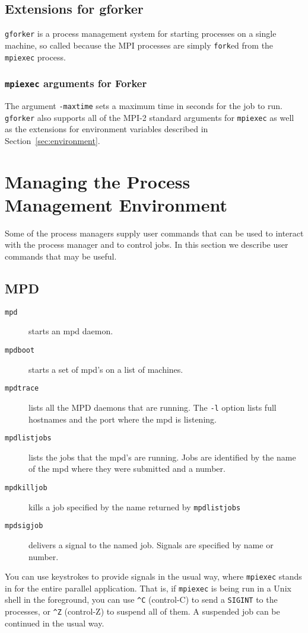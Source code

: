 \documentclass[dvipdfm,11pt]{article}
\begin{document}
\subsection{Extensions for gforker}
\label{sec:extensions-forker}
\texttt{gforker} is a process management system for starting
processes on a single machine, so called because the MPI processes are
simply \texttt{fork}ed from the \texttt{mpiexec} process.

\subsubsection{\texttt{mpiexec} arguments for Forker}
\label{sec:mpiexec-forker}

The argument \texttt{-maxtime} sets a maximum time in seconds for the
job to run.  \texttt{gforker} also supports all of the MPI-2 standard
arguments for \texttt{mpiexec} as well as the extensions for
environment variables described in Section~\ref{sec:environment}.


\section{Managing the Process Management Environment}
\label{sec:managing-pme}

Some of the process managers supply user commands that can be used to
interact with the process manager and to control jobs.  In this section
we describe user commands that may be useful.

\subsection{MPD}
\label{sec:managing-mpd}

\begin{description}
\item[\texttt{mpd}]  starts an mpd daemon.
\item[\texttt{mpdboot}] starts a set of mpd's on a list of machines.
\item[\texttt{mpdtrace}] lists all the MPD daemons that are running.  The
  \texttt{-l} option lists full hostnames and the port where the mpd is
  listening.
\item[\texttt{mpdlistjobs}] lists the jobs that the mpd's are running.
  Jobs are identified by the name of the mpd where they were submitted
  and a number.
\item[\texttt{mpdkilljob}] kills a job specified by the name returned by
  \texttt{mpdlistjobs }
\item[\texttt{mpdsigjob}] delivers a signal to the named job.  Signals
  are specified by name or number.
\end{description}
You can use keystrokes to provide signals in the usual way, where
\texttt{mpiexec} stands in for the entire parallel application.  That
is, if \texttt{mpiexec} is being run in a Unix shell in the foreground,
you can use \verb+^C+ (control-C) to send a \texttt{SIGINT} to the
processes, or \verb+^Z+ (control-Z) to suspend all of them.  A suspended
job can be continued in the usual way.
\end{document}
